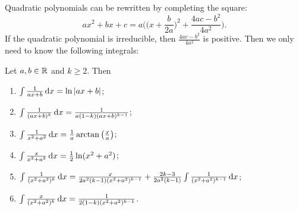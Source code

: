 Quadratic polynomials can be rewritten by completing the square:
\[ ax^2 + bx+c = a\bigg(\Big(x+ \frac{b}{2a}\Big)^2 + \frac{4ac - b^2}{4a^2}\bigg). \]
If the quadratic polynomial is irreducible, then $\frac{4ac - b^2}{4a^2}$ is positive.
Then we only need to know the following integrals:
\begin{proposition}
Let $a,b\in \mathbb{R}$ and $k\geq 2$. Then
\begin{enumerate}
\item $\int \frac{1}{ax+b}\operatorname{d \!}{x} = \ln|ax+ b|$;
\item $\int \frac{1}{(ax+b)^k}\operatorname{d \!}{x} = \frac{1}{a(1-k)(ax+b)^{k-1}}$;
\item $\int\frac{1}{x^2 + a^2}\operatorname{d \!}{x} = \frac{1}{a}\arctan\big(\frac{x}{a}\big)$;
\item $\int \frac{x}{x^2 + a^2}\operatorname{d \!}{x} = \frac{1}{2}\ln(x^2 + a^2)$;
\item $\int \frac{1}{(x^2 + a^2)^k} \operatorname{d \!}{x} = \frac{x}{2a^2(k-1)(x^2+a^2)^{k-1}}+\frac{2k-3}{2a^2(k-1)}\int \frac{1}{(x^2+ a^2)^{k-1}}\operatorname{d \!}{x}$;
\item $\int \frac{x}{(x^2 + a^2)^k}\operatorname{d \!}{x} = \frac{1}{2(1-k)(x^2+a^2)^{k-1}}$.
\end{enumerate}
\end{proposition}

